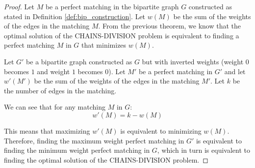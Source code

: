 \begin{proof}
    Let $M$ be a perfect matching in the bipartite graph $G$ constructed as stated in Definition \ref{def:bip_construction}. Let $w(M)$ be the sum of the weights of the edges in the matching $M$. From the previous theorem, we know that the optimal solution of the \textsc{CHAINS-DIVISION} problem is equivalent to finding a perfect matching $M$ in $G$ that minimizes $w(M)$.

    Let $G'$ be a bipartite graph constructed as $G$ but with inverted weights (weight $0$ becomes $1$ and weight $1$ becomes $0$). Let $M'$ be a perfect matching in $G'$ and let $w'(M')$ be the sum of the weights of the edges in the matching $M'$. Let $k$ be the number of edges in the matching.

    We can see that for any matching $M$ in $G$:
    \[ w'(M) = k - w(M) \]

    This means that maximizing $w'(M)$ is equivalent to minimizing $w(M)$. Therefore, finding the maximum weight perfect matching in $G'$ is equivalent to finding the minimum weight perfect matching in $G$, which in turn is equivalent to finding the optimal solution of the \textsc{CHAINS-DIVISION} problem.
\end{proof}
